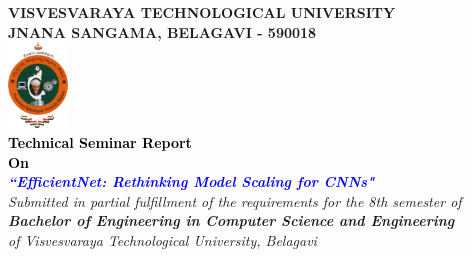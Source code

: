 \thispagestyle{empty}
\begin{titlepage}
\begin{center}
\textup{\large{\textcolor{darkbrown}{\bf VISVESVARAYA TECHNOLOGICAL UNIVERSITY} \\ {\textcolor{darkbrown}{\bf JNANA SANGAMA, BELAGAVI - 590018}}}}\\
\includegraphics[width=0.12\textwidth]{./../static/media/VTU.png}\\
\textup{\small{\textcolor{black}{\textbf{Technical Seminar Report} \\ {\textbf{On}}}}} \\
\textup{\large{\textcolor{blue}{\textbf{\textit{``EfficientNet: Rethinking Model Scaling for CNNs"}}}}} \\

\textup{{\textit {Submitted in partial fulfillment of the requirements for the 8th semester of} \\ {\textbf {\textit {Bachelor of Engineering in Computer Science and Engineering}} \\ \textit {of Visvesvaraya Technological University, Belagavi}}}}\\


\end{center}
\end{titlepage}
